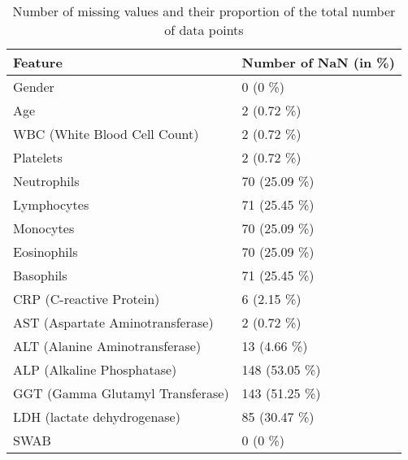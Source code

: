 \begin{table}
\centering
\begin{tabular}{ll}
Feature                          & Number of NaN (in \%) \\ \hline
Gender                           & 0 (0 \%)              \\
Age                              & 2 (0.72 \%)           \\
WBC (White Blood Cell Count)     & 2 (0.72 \%)           \\
Platelets                        & 2 (0.72 \%)           \\
Neutrophils                      & 70 (25.09 \%)         \\
Lymphocytes                      & 71 (25.45 \%)         \\
Monocytes                        & 70 (25.09 \%)         \\
Eosinophils                      & 70 (25.09 \%)         \\
Basophils                        & 71 (25.45 \%)         \\
CRP (C-reactive Protein)         & 6 (2.15 \%)           \\
AST (Aspartate Aminotransferase) & 2 (0.72 \%)           \\
ALT (Alanine Aminotransferase)   & 13 (4.66 \%)          \\
ALP (Alkaline Phosphatase)       & 148 (53.05 \%)        \\
GGT (Gamma Glutamyl Transferase) & 143 (51.25 \%)        \\
LDH (lactate dehydrogenase)      & 85 (30.47 \%)         \\
SWAB                             & 0 (0 \%)             
\end{tabular}
\caption{Number of missing values and their proportion of the total number of 
data 
points}
\label{tab:nan-overview}
\end{table}
